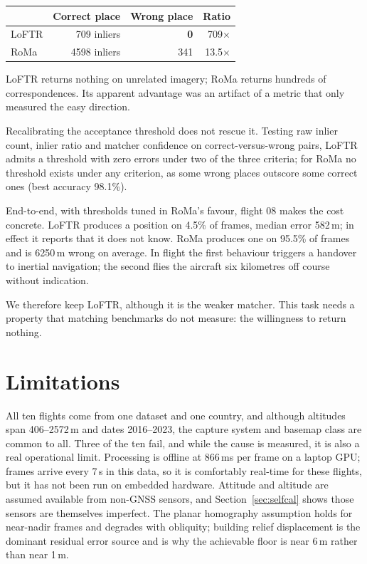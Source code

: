 \documentclass[conference]{IEEEtran}
\begin{document}
\begin{center}
\small
\begin{tabular}{lrrr}
\toprule
 & Correct place & Wrong place & Ratio \\
\midrule
LoFTR & 709 inliers & \textbf{0} & 709$\times$ \\
RoMa  & 4598 inliers & 341 & 13.5$\times$ \\
\bottomrule
\end{tabular}
\end{center}

LoFTR returns nothing on unrelated imagery; RoMa returns hundreds of
correspondences. Its apparent advantage was an artifact of a metric that only
measured the easy direction.

Recalibrating the acceptance threshold does not rescue it. Testing raw inlier
count, inlier ratio and matcher confidence on correct-versus-wrong pairs, LoFTR
admits a threshold with zero errors under two of the three criteria; for RoMa
no threshold exists under any criterion, as some wrong places outscore some
correct ones (best accuracy 98.1\%).

End-to-end, with thresholds tuned in RoMa's favour, flight 08 makes the cost
concrete. LoFTR produces a position on 4.5\% of frames, median error 582\,m;
in effect it reports that it does not know. RoMa produces one on 95.5\% of frames
and is 6250\,m wrong on average. In flight the first behaviour triggers a
handover to inertial navigation; the second flies the aircraft six kilometres
off course without indication.

We therefore keep LoFTR, although it is the weaker matcher. This task needs a
property that matching benchmarks do not measure: the willingness to return
nothing.

\section{Limitations}

All ten flights come from one dataset and one country, and although altitudes
span 406--2572\,m and dates 2016--2023, the capture system and basemap class
are common to all. Three of the ten fail, and while the cause is measured, it
is also a real operational limit. Processing is offline at 866\,ms per frame on
a laptop GPU; frames arrive every 7\,s in this data, so it is comfortably
real-time for these flights, but it has not been run on embedded hardware.
Attitude and altitude are assumed available from non-GNSS sensors, and
Section~\ref{sec:selfcal} shows those sensors are themselves imperfect. The
planar homography assumption holds for near-nadir frames and degrades with
obliquity; building relief displacement is the dominant residual error source
and is why the achievable floor is near 6\,m rather than near 1\,m.
\end{document}
